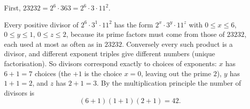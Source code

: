 First, $23232=2^6\cdot363=2^6\cdot3\cdot11^2$.

Every positive divisor of $2^6\cdot3^1\cdot11^2$ has the form $2^x\cdot3^y\cdot11^z$ with $0\le x\le6$, $0\le y\le1$, $0\le z\le2$, because its prime factors must come from those of $23232$, each used at most as often as in $23232$. Conversely every such product is a divisor, and different exponent triples give different numbers (unique factorisation). So divisors correspond exactly to choices of exponents: $x$ has $6+1=7$ choices (the $+1$ is the choice $x=0$, leaving out the prime $2$), $y$ has $1+1=2$, and $z$ has $2+1=3$. By the multiplication principle the number of divisors is
\[
(6+1)(1+1)(2+1)=\boxed{42}.
\]
